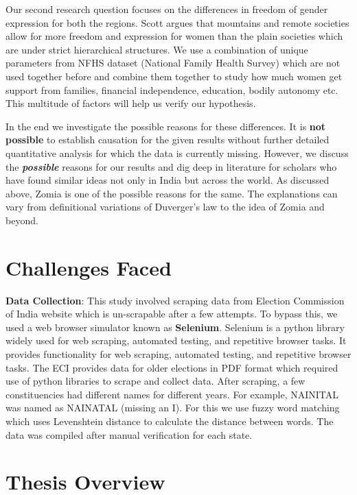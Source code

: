 \begin{sloppypar}
\vspace{0.2cm}

Our second research question focuses on the differences in freedom of gender expression for both the regions. Scott argues that mountains and remote societies allow for more freedom and expression for women than the plain societies which are under strict hierarchical structures. We use a combination of unique parameters from NFHS dataset (National Family Health Survey) which are not used together before and combine them together to study how much women get support from families, financial independence, education, bodily autonomy etc. This multitude of factors will help us verify our hypothesis.

\vspace{0.2cm}

In the end we investigate the possible reasons for these differences. It is \textbf{not possible} to establish causation for the given results without further detailed quantitative analysis for which the data is currently missing. However, we discuss the \textit{\textbf{possible}} reasons for our results and dig deep in literature for scholars who have found similar ideas not only in India but across the world. As discussed above, Zomia is one of the possible reasons for the same. The explanations can vary from definitional variations of Duverger's law to the idea of Zomia and beyond. 

\section{Challenges Faced}

\textbf{Data Collection}: This study involved scraping data from Election Commission of India website which is un-scrapable after a few attempts. To bypass this, we used a web browser simulator known as \textbf{Selenium}. Selenium is a python library widely used for web scraping, automated testing, and repetitive browser tasks. It provides functionality for web scraping, automated testing, and repetitive browser tasks. The ECI provides data for older elections in PDF format which required use of python libraries to scrape and collect data. After scraping, a few constituencies had different names for different years. For example, NAINITAL was named as NAINATAL (missing an I). For this we use fuzzy word matching which uses Levenshtein distance to calculate the distance between words. The data was compiled after manual verification for each state.

\section{Thesis Overview}


\end{sloppypar}
